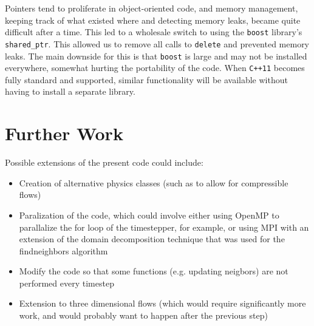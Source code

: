 \documentclass[11pt]{article}
\begin{document}
Pointers tend to proliferate in object-oriented code, and memory management,
keeping track of what existed where and detecting memory leaks, became quite
difficult after a time. This led to a wholesale switch to using the
\texttt{boost} library's \texttt{shared\_ptr}. This allowed us to remove all
calls to \texttt{delete} and prevented memory leaks. The main downside for 
this is that \texttt{boost} is large and may not be installed everywhere, 
somewhat hurting the portability of the code. When \texttt{C++11} becomes
fully standard and supported, similar functionality will be available without
having to install a separate library.

\section{Further Work}
Possible extensions of the present code could include:
\begin{itemize}
\item Creation of alternative physics classes (such as to allow for compressible flows)
\item Paralization of the code, which could involve either using OpenMP to parallalize the for loop of the timestepper, for example, or using MPI with an extension of the domain decomposition technique that was used
for the findneighbors algorithm
\item Modify the code so that some functions (e.g. updating neigbors) are not performed every timestep
\item Extension to three dimensional flows (which would require significantly more work, and would probably
want to happen after the previous step)
\end{itemize}



\end{document}
